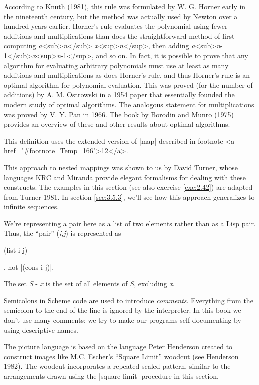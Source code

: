 \begin{Exercise}
\begin{Exercise}
\begin{Exercise}
\begin{Exercise}
\begin{Exercise}
\begin{Exercise}
\begin{Exercise}
\begin{Exercise}
\begin{Exercise}
\begin{Exercise}
\begin{Exercise}
\begin{Exercise}
According to Knuth (1981), this rule was formulated by
W. G. Horner early in the nineteenth century, but the method was
actually used by Newton over a hundred years earlier.  Horner's rule
evaluates the polynomial using fewer additions and multiplications
than does the straightforward method of first computing \textit{a}<sub>\textit{n}</sub> \textit{x}<sup>\textit{n}</sup>,
then adding \textit{a}<sub>\textit{n}-1</sub>\textit{x}<sup>\textit{n}-1</sup>, and so on.  In fact, it is possible to
prove that any algorithm for evaluating arbitrary polynomials must use
at least as many additions and multiplications as does Horner's rule,
and thus Horner's rule is an optimal algorithm for polynomial
evaluation.  This was proved (for the number of additions) by
A. M. Ostrowski in a 1954 paper that essentially founded the modern
study of optimal algorithms.  The analogous statement for
multiplications was proved by V. Y. Pan in 1966.  The book by Borodin
and Munro (1975) provides an overview of these and other results about
optimal algorithms.

This definition uses the
extended version of \scheme|map| described in footnote <a href="#footnote_Temp_166">12</a>.

This approach to nested mappings was shown
to us by David Turner, whose languages KRC and Miranda provide elegant
formalisms for dealing with these constructs.  The examples in this
section (see also exercise \ref{exc:2.42}) are adapted from Turner
1981.  In section \ref{sec:3.5.3}, we'll see how this
approach generalizes to infinite sequences.

We're
representing a pair here as a list of two elements rather than as a
Lisp pair.  Thus, the ``pair'' (\textit{i},\textit{j}) is represented as \begin{schemedisplay}
(list i
j)\end{schemedisplay}, not \scheme|(cons i j)|.

The set \textit{S} - \textit{x} is the set of all elements
of \textit{S}, excluding \textit{x}.

Semicolons in Scheme code are used to
introduce \textit{comments}.  Everything from the semicolon to the end of
the line is ignored by the interpreter.  In this book we don't use
many comments; we try to make our programs self-documenting by using
descriptive names.

The picture language is based on the language
Peter Henderson created to construct
images like M.C. Escher's ``Square Limit'' woodcut (see Henderson 1982).
The woodcut incorporates a
repeated scaled pattern, similar to the arrangements drawn using
the \scheme|square-limit| procedure in this section.


\end{Exercise}
\end{Exercise}
\end{Exercise}
\end{Exercise}
\end{Exercise}
\end{Exercise}
\end{Exercise}
\end{Exercise}
\end{Exercise}
\end{Exercise}
\end{Exercise}
\end{Exercise}
